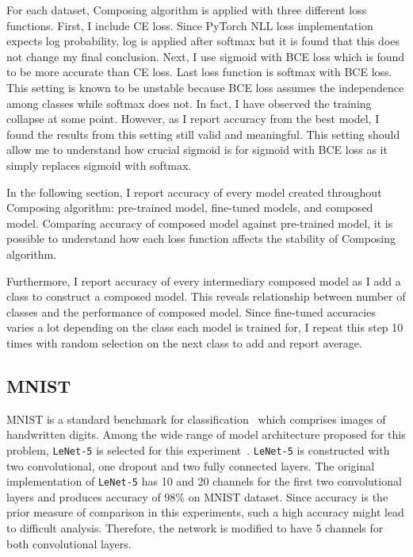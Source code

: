 \documentclass{article}
\begin{document}
For each dataset, Composing algorithm is applied with three different loss functions. First, I include CE loss. Since PyTorch NLL loss implementation expects log probability, log is applied after softmax but it is found that this does not change my final conclusion. Next, I use sigmoid with BCE loss which is found to be more accurate than CE loss. Last loss function is softmax with BCE loss. This setting is known to be unstable because BCE loss assumes the independence among classes while softmax does not. In fact, I have observed the training collapse at some point. However, as I report accuracy from the best model, I found the results from this setting still valid and meaningful. This setting should allow me to understand how crucial sigmoid is for sigmoid with BCE loss as it simply replaces sigmoid with softmax.

In the following section, I report accuracy of every model created throughout Composing algorithm: pre-trained model, fine-tuned models, and composed model. Comparing accuracy of composed model against pre-trained model, it is possible to understand how each loss function affects the stability of Composing algorithm.

Furthermore, I report accuracy of every intermediary composed model as I add a class to construct a composed model. This reveals relationship between number of classes and the performance of composed model. Since fine-tuned accuracies varies a lot depending on the class each model is trained for, I repeat this step 10 times with random selection on the next class to add and report average.

\subsection{MNIST}

MNIST is a standard benchmark for classification~\cite{lecun1998gradient} which comprises images of handwritten digits. Among the wide range of model architecture proposed for this problem, \texttt{LeNet-5} is selected for this experiment~\cite{lecun2015lenet}. \texttt{LeNet-5} is constructed with two convolutional, one dropout and two fully connected layers. The original implementation of \texttt{LeNet-5} has 10 and 20 channels for the first two convolutional layers and produces accuracy of 98\% on MNIST dataset. Since accuracy is the prior measure of comparison in this experiments, such a high accuracy might lead to difficult analysis. Therefore, the network is modified to have 5 channels for both convolutional layers.
\end{document}
